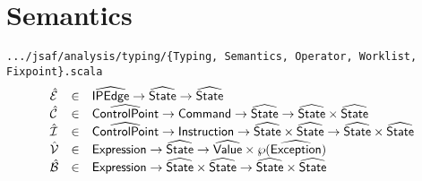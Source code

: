 \section{Semantics}
{\inblue\tt .../jsaf/analysis/typing/\{Typing, Semantics, Operator, Worklist, Fixpoint\}.scala}\\
\[
\begin{array}{lcl}
  \aE & \in & \abs{IPEdge} \rightarrow \aState \rightarrow \aState \\
  \aN & \in & \aControlPoint \rightarrow \Command \rightarrow \aState \rightarrow \aState \times \aState\\
  \aI & \in & \aControlPoint \rightarrow \SF{Instruction} \rightarrow \aState \times \aState \rightarrow \aState \times \aState\\
  \aV & \in & \SF{Expression} \rightarrow \aState \rightarrow \aValue \times \powerset{\abs{Exception}} \\
  \aB & \in & \SF{Expression} \rightarrow \aState \times \aState \rightarrow \aState \times \aState\\
\end{array}
\]
